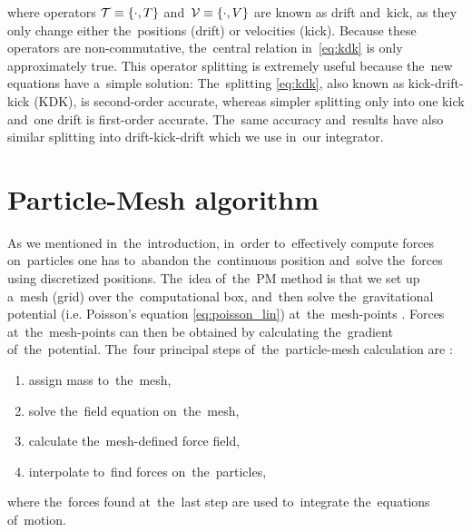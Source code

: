 where operators \(\mathcal{T}\equiv\{\cdot,T\}\) and~\(\mathcal{V}\equiv\{\cdot,V\}\) are known as drift and~kick, as they only change either the~positions (drift) or velocities (kick). Because these operators are non-commutative, the~central relation in~\eqref{eq:kdk} is only approximately true. This operator splitting is extremely useful because the~new equations have a~simple solution:
The~splitting \eqref{eq:kdk}, also known as kick-drift-kick (KDK), is second-order accurate, whereas simpler splitting only into one kick and~one drift is first-order accurate. The~same accuracy and~results have also similar splitting into drift-kick-drift which we use in~our integrator.
\section{Particle-Mesh algorithm}
\label{sec:PM}
As we mentioned in~the~introduction, in~order to~effectively compute forces on~particles one has to~abandon the~continuous position and~solve the~forces using discretized positions. The~idea of~the~PM method is that we set up a~mesh (grid) over the~computational box, and~then \DIFaddbegin {}\DIFaddend solve the~gravitational potential (i.e. Poisson’s equation \eqref{eq:poisson_lin}) at~the~mesh-points \DIFaddbegin \parencite{n_body_Lindholm}\DIFaddend . Forces at~the~mesh-points can then be obtained by calculating the~gradient of~the~potential. The~four principal steps of~the~particle-mesh calculation are \DIFaddbegin \parencite{Hockney:1988:CSU:62815}\DIFaddend :
\begin{enumerate}
    \item assign mass to~the~mesh,
    \label{it:pm_1}
    \item solve the~field equation on~the~mesh,
    \label{it:pm_2}
    \item calculate the~mesh-defined force field,
    \label{it:pm_3}
    \item interpolate to~find forces on~the~particles,
    \label{it:pm_4}
\end{enumerate}
where the~forces found at~the~last step are used to~integrate the~equations of~motion.

